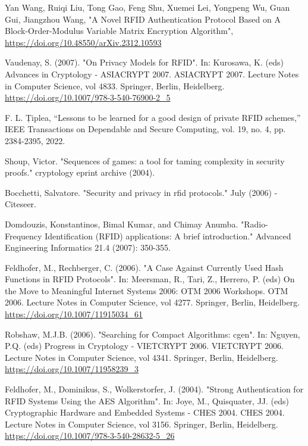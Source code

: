 \begin{thebibliography}{9}


Yan Wang, Ruiqi Liu, Tong Gao, Feng Shu, Xuemei Lei, Yongpeng Wu, Guan Gui, Jiangzhou Wang,
 "A Novel RFID Authentication Protocol Based on A Block-Order-Modulus Variable Matrix Encryption Algorithm", 
  \url{https://doi.org/10.48550/arXiv.2312.10593}

 Vaudenay, S. (2007). 
 "On Privacy Models for RFID".  
 In: Kurosawa, K. (eds) Advances in Cryptology - ASIACRYPT 2007. ASIACRYPT 2007. 
 Lecture Notes in Computer Science, vol 4833. Springer, Berlin, Heidelberg. 
 \url{https://doi.org/10.1007/978-3-540-76900-2_5}

F. L. Țiplea, “Lessons to be learned for a good design of private RFID schemes,” IEEE Transactions on Dependable and Secure Computing,
vol. 19, no. 4, pp. 2384-2395, 2022.

Shoup, Victor. "Sequences of games: a tool for taming complexity in security proofs." cryptology eprint archive (2004).

Bocchetti, Salvatore. "Security and privacy in rfid protocols." July (2006) - Citeseer.

Domdouzis, Konstantinos, Bimal Kumar, and Chimay Anumba. "Radio-Frequency Identification (RFID) applications: A brief introduction." 
Advanced Engineering Informatics 21.4 (2007): 350-355.

Feldhofer, M., Rechberger, C. (2006). "A Case Against Currently Used Hash Functions in RFID Protocols". 
In: Meersman, R., Tari, Z., Herrero, P. (eds) On the Move to Meaningful Internet Systems 2006: OTM 2006 Workshops. OTM 2006. 
Lecture Notes in Computer Science, vol 4277. Springer, Berlin, Heidelberg. 
\url{https://doi.org/10.1007/11915034_61}

Robshaw, M.J.B. (2006). "Searching for Compact Algorithms: cgen". 
In: Nguyen, P.Q. (eds) Progress in Cryptology - VIETCRYPT 2006. VIETCRYPT 2006. Lecture Notes in Computer Science, vol 4341. 
Springer, Berlin, Heidelberg. 
\url{https://doi.org/10.1007/11958239_3}

Feldhofer, M., Dominikus, S., Wolkerstorfer, J. (2004). 
"Strong Authentication for RFID Systems Using the AES Algorithm". 
In: Joye, M., Quisquater, JJ. (eds) Cryptographic Hardware and Embedded Systems - CHES 2004. CHES 2004. Lecture Notes in Computer Science, 
vol 3156. Springer, Berlin, Heidelberg. \url{https://doi.org/10.1007/978-3-540-28632-5_26}


\end{thebibliography}
